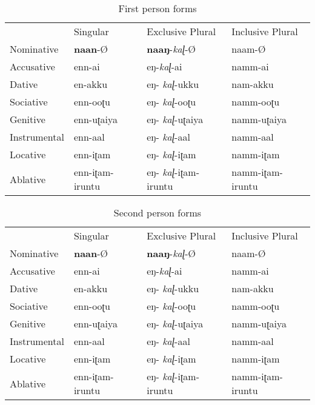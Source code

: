 \documentclass[output=paper,colorlinks,citecolor=brown,
]{langscibook}
\begin{document}
\begin{table}[]
    \centering
    \begin{tabular}{llll}
                 & Singular        & Exclusive Plural      & Inclusive Plural \\
    Nominative   & \textbf{naan}-Ø          & \textbf{naaŋ}-\textit{kaɭ}-Ø            & naam-Ø           \\
    Accusative   & enn-ai          & eŋ-\textit{kaɭ}-ai             & namm-ai          \\
    Dative       & en-akku         & eŋ-   \textit{kaɭ}-ukku        & nam-akku         \\
    Sociative    & enn-ooʈu        & eŋ-   \textit{kaɭ}-ooʈu        & namm-ooʈu        \\
    Genitive     & enn-uʈaiya      & eŋ-   \textit{kaɭ}-uʈaiya      & namm-uʈaiya      \\
    Instrumental & enn-aal         & eŋ-   \textit{kaɭ}-aal         & namm-aal         \\
    Locative     & enn-iʈam        & eŋ-   \textit{kaɭ}-iʈam        & namm-iʈam        \\
    Ablative     & enn-iʈam-iruntu & eŋ-   \textit{kaɭ}-iʈam-iruntu & namm-iʈam-iruntu
    \end{tabular}
    \caption{First person forms \citep{steever2019dravidian}}
    \label{new2a}
\end{table}

\begin{table}[]
    \centering
    \begin{tabular}{llll}
                 & Singular        & Exclusive Plural      & Inclusive Plural \\
    Nominative   & \textbf{naan}-Ø          & \textbf{naaŋ}-\textit{kaɭ}-Ø            & naam-Ø           \\
    Accusative   & enn-ai          & eŋ-\textit{kaɭ}-ai             & namm-ai          \\
    Dative       & en-akku         & eŋ-   \textit{kaɭ}-ukku        & nam-akku         \\
    Sociative    & enn-ooʈu        & eŋ-   \textit{kaɭ}-ooʈu        & namm-ooʈu        \\
    Genitive     & enn-uʈaiya      & eŋ-   \textit{kaɭ}-uʈaiya      & namm-uʈaiya      \\
    Instrumental & enn-aal         & eŋ-   \textit{kaɭ}-aal         & namm-aal         \\
    Locative     & enn-iʈam        & eŋ-   \textit{kaɭ}-iʈam        & namm-iʈam        \\
    Ablative     & enn-iʈam-iruntu & eŋ-   \textit{kaɭ}-iʈam-iruntu & namm-iʈam-iruntu
    \end{tabular}
    \caption{Second person forms \citep{steever2019dravidian}}
    \label{new2b}
\end{table}
\end{document}
